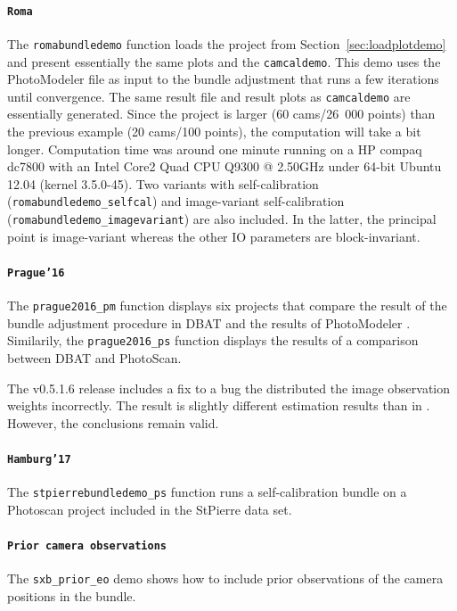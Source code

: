 \documentclass{article}
\begin{document}
\paragraph{\texttt{Roma}}
\label{sec:org59a756e}
\sloppy The \texttt{romabundledemo} function loads the project from
Section~\ref{sec:loadplotdemo} and present essentially the same plots and
the \texttt{camcaldemo}. This demo uses the PhotoModeler file as input
to the bundle adjustment that runs a few iterations until convergence.
The same result file and result plots as \texttt{camcaldemo} are
essentially generated. Since the project is larger (60 cams/26~000
points) than the previous example (20 cams/100 points), the
computation will take a bit longer. Computation time was around one
minute running on a HP compaq dc7800 with an Intel Core2 Quad CPU
Q9300 @ 2.50GHz under 64-bit Ubuntu 12.04 (kernel 3.5.0-45). Two
variants with self-calibration (\texttt{romabundledemo\_selfcal}) and
image-variant self-calibration (\texttt{romabundledemo\_imagevariant})
are also included. In the latter, the principal point is image-variant
whereas the other IO parameters are block-invariant.

\paragraph{\texttt{Prague'16}}
\label{sec:orgafbb256}
The \texttt{prague2016\_pm} function displays six projects that
compare the result of the bundle adjustment procedure in DBAT and the
results of PhotoModeler \citep{Borlin2016:External}. Similarily, the
\texttt{prague2016\_ps} function displays the results of a comparison
between DBAT and PhotoScan.

The v0.5.1.6 release includes a fix to a bug the distributed the image
observation weights incorrectly. The result is slightly different
estimation results than in \citet{Borlin2016:External}. However, the
conclusions remain valid.

\paragraph{\texttt{Hamburg'17}}
\label{sec:org2c7f739}
The \texttt{stpierrebundledemo\_ps} function runs a self-calibration
bundle on a Photoscan project included in the StPierre data set.

\paragraph{\texttt{Prior camera observations}}
\label{sec:org7d676a6}
The \texttt{sxb\_prior\_eo} demo shows how to include prior
observations of the camera positions in the bundle.
\end{document}
